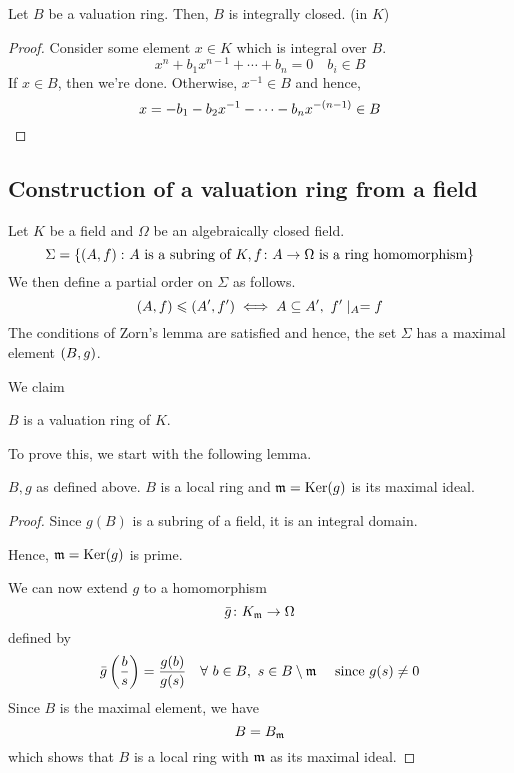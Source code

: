 \begin{proposition}{}{}
\label{prop:5.18.3}
	Let \(B\) be a valuation ring.
	Then, \(B\) is integrally closed.
	(in \(K\))
\end{proposition}
\begin{proof}
	Consider some element \(x \in K\) which is integral over \(B\).
	\[
		x^n + b_1 x^{n-1} + \cdots + b_n = 0 \quad b_i \in B
	\]
	If \(x \in B\), then we're done.
	Otherwise, \(x^{-1} \in B\) and hence,
	\[
		x = -b_1 - b_2 x^{-1} - \cdots - b_n x^{-(n-1)} \in B \qedhere
	\]
\end{proof}


\subsection{Construction of a valuation ring from a field}

Let \(K\) be a field and \(\Omega\) be an algebraically closed field.
\[
	\Sigma = \left\{ \left( A, f \right) \colon A \text{ is a subring of } K,
		f \colon A \to \Omega \text{ is a ring homomorphism}
	 \right\}
\]
We then define a partial order on \(\Sigma\) as follows.
\[
	\left( A, f \right) \leqslant \left( A', f' \right) \iff A \subseteq A', \ f' \mid_A = f
\]
The conditions of Zorn's lemma are satisfied and hence, the set
\(\Sigma\) has a maximal element \(\left( B, g \right)\).

We claim
\begin{claim}{}{}
	\(B\) is a valuation ring of \(K\).
\end{claim}

To prove this, we start with the following lemma.
\begin{lemma}{}{}
\label{lemma:5.19}
	\(B, g\) as defined above.
	\(B\) is a local ring and \(\mathfrak{m} = \operatorname{Ker} (g)\) is its maximal ideal.
\end{lemma}
\begin{proof}
	Since \(g(B)\) is a subring of a field, it is an integral domain.

	Hence,
	\(
		\mathfrak{m} = \operatorname{Ker} (g)
	\)
	is prime.

	We can now extend \(g\) to a homomorphism
	\[
		\bar{g} \colon K_{\mathfrak{m}} \to \Omega
	\]
	defined by
	\[
		\bar{g}\left( \frac{b}{s} \right) = \frac{g(b)}{g(s)}
		\quad \forall\ b \in B, \ s \in B \setminus \mathfrak{m}
		\quad \text{ since } g(s) \neq 0
	\]
	Since \(B\) is the maximal element,
	we have
	\[
		B = B_{\mathfrak{m}}
	\]
	which shows that \(B\) is a local ring with \(\mathfrak{m}\) as its maximal
	ideal.
\end{proof}

